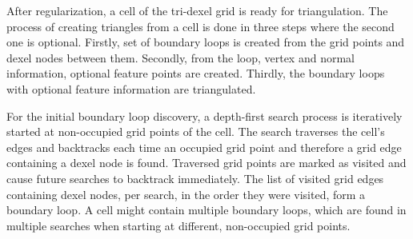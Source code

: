 After regularization, a cell of the tri-dexel grid is ready for triangulation.
The process of creating triangles from a cell is done in three steps where the second one is optional.
Firstly, set of boundary loops is created from the grid points and dexel nodes between them.
Secondly, from the loop, vertex and normal information, optional feature points are created.
Thirdly, the boundary loops with optional feature information are triangulated.

For the initial boundary loop discovery, a depth-first search process is iteratively started at non-occupied grid points of the cell.
The search traverses the cell's edges and backtracks each time an occupied grid point and therefore a grid edge containing a dexel node is found.
Traversed grid points are marked as visited and cause future searches to backtrack immediately.
The list of visited grid edges containing dexel nodes, per search, in the order they were visited, form a boundary loop.
A cell might contain multiple boundary loops, which are found in multiple searches when starting at different, non-occupied grid points.

